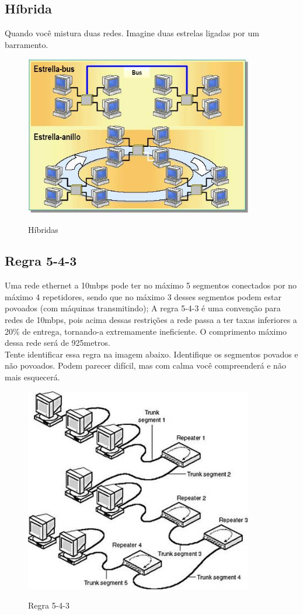 \documentclass{article}
\begin{document}
\subsection{Híbrida}
Quando você mistura duas redes. Imagine duas estrelas ligadas por um
barramento.

\begin{figure}[h]
    \center
    \includegraphics[width=10cm]{imagens/hibridas.jpg}
    \label{hibridas}
    \caption{Híbridas}
\end{figure}

\subsection{Regra 5-4-3}
Uma rede ethernet a 10mbps pode ter no máximo 5 segmentos conectados por no
máximo 4 repetidores, sendo que no máximo 3 desses segmentos podem estar
povoados (com máquinas transmitindo); A regra 5-4-3 é uma convenção para redes
de 10mbps, pois acima dessas restrições a rede passa a ter taxas inferiores a
20\% de entrega, tornando-a extremamente ineficiente. O comprimento máximo dessa
rede será de 925metros.\\
Tente identificar essa regra na imagem abaixo. Identifique os segmentos povados
e não povoados. Podem parecer difícil, mas com calma você compreenderá e não
mais esquecerá.

\begin{figure}[h]
    \center
    \includegraphics[width=10cm]{imagens/543.png}
    \label{543}
    \caption{Regra 5-4-3}
\end{figure}
\end{document}
